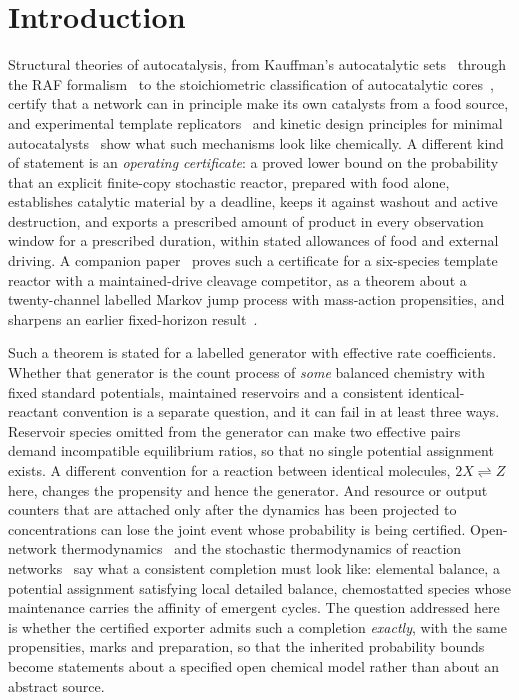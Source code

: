 \documentclass[11pt,a4paper]{article}
\theoremstyle{plain}
\theoremstyle{definition}
\theoremstyle{remark}
\begin{document}
\section{Introduction}\label{sec:intro}

Structural theories of autocatalysis, from Kauffman's autocatalytic sets~\citep{kauffman1986} through the RAF formalism~\citep{hordijk2004,steel2019} to the stoichiometric classification of autocatalytic cores~\citep{blokhuis2020}, certify that a network can in principle make its own catalysts from a food source, and experimental template replicators~\citep{vonkiedrowski1986,sievers1994,lincoln2009} and kinetic design principles for minimal autocatalysts~\citep{sakref2024} show what such mechanisms look like chemically. A different kind of statement is an \emph{operating certificate}: a proved lower bound on the probability that an explicit finite-copy stochastic reactor, prepared with food alone, establishes catalytic material by a deadline, keeps it against washout and active destruction, and exports a prescribed amount of product in every observation window for a prescribed duration, within stated allowances of food and external driving. A companion paper~\citep{exporter2026} proves such a certificate for a six-species template reactor with a maintained-drive cleavage competitor, as a theorem about a twenty-channel labelled Markov jump process with mass-action propensities, and sharpens an earlier fixed-horizon result~\citep{finitecopy2026}.

Such a theorem is stated for a labelled generator with effective rate coefficients. Whether that generator is the count process of \emph{some} balanced chemistry with fixed standard potentials, maintained reservoirs and a consistent identical-reactant convention is a separate question, and it can fail in at least three ways. Reservoir species omitted from the generator can make two effective pairs demand incompatible equilibrium ratios, so that no single potential assignment exists. A different convention for a reaction between identical molecules, $2X\rightleftharpoons Z$ here, changes the propensity and hence the generator. And resource or output counters that are attached only after the dynamics has been projected to concentrations can lose the joint event whose probability is being certified. Open-network thermodynamics~\citep{polettini2014,rao2016,rao2018,falasco2025} and the stochastic thermodynamics of reaction networks~\citep{schmiedl2007} say what a consistent completion must look like: elemental balance, a potential assignment satisfying local detailed balance, chemostatted species whose maintenance carries the affinity of emergent cycles. The question addressed here is whether the certified exporter admits such a completion \emph{exactly}, with the same propensities, marks and preparation, so that the inherited probability bounds become statements about a specified open chemical model rather than about an abstract source.
\end{document}
